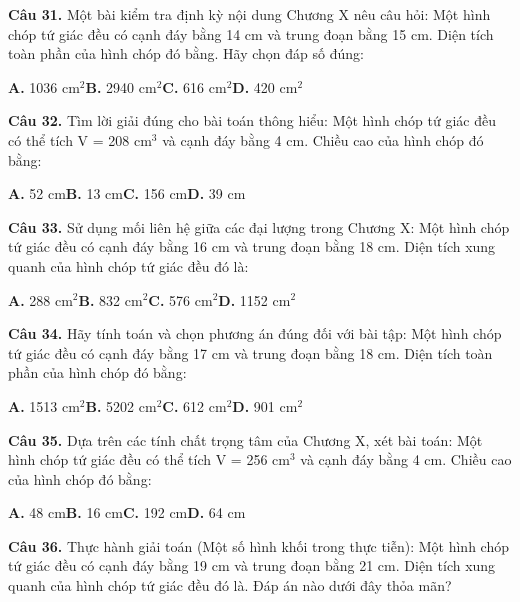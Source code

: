 \documentclass[11pt,a4paper]{article}
\begin{document}
\textbf{\color{primary} Câu 31.} Một bài kiểm tra định kỳ nội dung Chương X nêu câu hỏi: Một hình chóp tứ giác đều có cạnh đáy bằng 14 cm và trung đoạn bằng 15 cm. Diện tích toàn phần của hình chóp đó bằng. Hãy chọn đáp số đúng:\par
\hspace*{1.5em}\textbf{A.} 1036 cm$^2$\quad\quad \textbf{B.} 2940 cm$^2$\quad\quad \textbf{C.} 616 cm$^2$\quad\quad \textbf{D.} 420 cm$^2$\par\vspace{2pt}
\textbf{\color{primary} Câu 32.} Tìm lời giải đúng cho bài toán thông hiểu: Một hình chóp tứ giác đều có thể tích V = 208 cm$^3$ và cạnh đáy bằng 4 cm. Chiều cao của hình chóp đó bằng:\par
\hspace*{1.5em}\textbf{A.} 52 cm\quad\quad \textbf{B.} 13 cm\quad\quad \textbf{C.} 156 cm\quad\quad \textbf{D.} 39 cm\par\vspace{2pt}
\textbf{\color{primary} Câu 33.} Sử dụng mối liên hệ giữa các đại lượng trong Chương X: Một hình chóp tứ giác đều có cạnh đáy bằng 16 cm và trung đoạn bằng 18 cm. Diện tích xung quanh của hình chóp tứ giác đều đó là:\par
\hspace*{1.5em}\textbf{A.} 288 cm$^2$\quad\quad \textbf{B.} 832 cm$^2$\quad\quad \textbf{C.} 576 cm$^2$\quad\quad \textbf{D.} 1152 cm$^2$\par\vspace{2pt}
\textbf{\color{primary} Câu 34.} Hãy tính toán và chọn phương án đúng đối với bài tập: Một hình chóp tứ giác đều có cạnh đáy bằng 17 cm và trung đoạn bằng 18 cm. Diện tích toàn phần của hình chóp đó bằng:\par
\hspace*{1.5em}\textbf{A.} 1513 cm$^2$\quad\quad \textbf{B.} 5202 cm$^2$\quad\quad \textbf{C.} 612 cm$^2$\quad\quad \textbf{D.} 901 cm$^2$\par\vspace{2pt}
\textbf{\color{primary} Câu 35.} Dựa trên các tính chất trọng tâm của Chương X, xét bài toán: Một hình chóp tứ giác đều có thể tích V = 256 cm$^3$ và cạnh đáy bằng 4 cm. Chiều cao của hình chóp đó bằng:\par
\hspace*{1.5em}\textbf{A.} 48 cm\quad\quad \textbf{B.} 16 cm\quad\quad \textbf{C.} 192 cm\quad\quad \textbf{D.} 64 cm\par\vspace{2pt}
\textbf{\color{primary} Câu 36.} Thực hành giải toán (Một số hình khối trong thực tiễn): Một hình chóp tứ giác đều có cạnh đáy bằng 19 cm và trung đoạn bằng 21 cm. Diện tích xung quanh của hình chóp tứ giác đều đó là. Đáp án nào dưới đây thỏa mãn?\par
\end{document}
